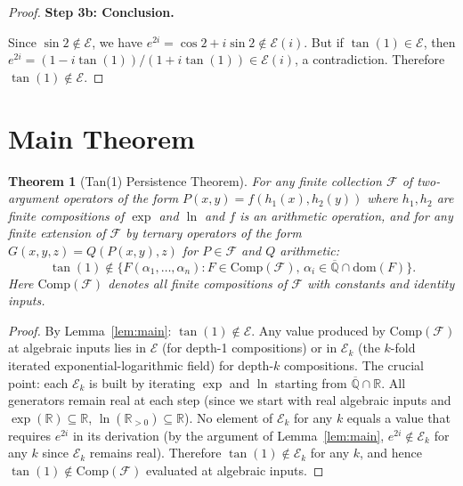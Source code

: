 \documentclass[11pt]{article}
\newtheorem{theorem}{Theorem}
\begin{document}
\begin{proof}
\noindent\textbf{Step 3b: Conclusion.}

Since $\sin 2 \notin \mathcal{E}$, we have $e^{2i} = \cos 2 + i\sin 2 \notin \mathcal{E}(i)$.
But if $\tan(1) \in \mathcal{E}$, then $e^{2i} = (1-i\tan(1))/(1+i\tan(1)) \in \mathcal{E}(i)$,
a contradiction. Therefore $\tan(1) \notin \mathcal{E}$.
\end{proof}

\section{Main Theorem}
\label{sec:theorem}

\begin{theorem}[Tan(1) Persistence Theorem]
\label{thm:main}
For any finite collection $\mathcal{F}$ of two-argument operators of the form
$P(x,y) = f(h_1(x), h_2(y))$ where $h_1, h_2$ are finite compositions of
$\exp$ and $\ln$ and $f$ is an arithmetic operation, and for any finite
extension of $\mathcal{F}$ by ternary operators of the form
$G(x,y,z) = Q(P(x,y), z)$ for $P \in \mathcal{F}$ and $Q$ arithmetic:
\[
  \tan(1) \notin \{F(\alpha_1,\ldots,\alpha_n) :
    F \in \mathrm{Comp}(\mathcal{F}),\, \alpha_i \in \overline{\mathbb{Q}} \cap \mathrm{dom}(F)\}.
\]
Here $\mathrm{Comp}(\mathcal{F})$ denotes all finite compositions of $\mathcal{F}$
with constants and identity inputs.
\end{theorem}

\begin{proof}
By Lemma~\ref{lem:main}: $\tan(1) \notin \mathcal{E}$.
Any value produced by $\mathrm{Comp}(\mathcal{F})$ at algebraic inputs lies in
$\mathcal{E}$ (for depth-1 compositions) or in $\mathcal{E}_k$ (the $k$-fold
iterated exponential-logarithmic field) for depth-$k$ compositions.
The crucial point: each $\mathcal{E}_k$ is built by iterating $\exp$ and $\ln$
starting from $\overline{\mathbb{Q}} \cap \mathbb{R}$. All generators remain real at each step
(since we start with real algebraic inputs and $\exp(\mathbb{R}) \subseteq \mathbb{R}$,
$\ln(\mathbb{R}_{>0}) \subseteq \mathbb{R}$). No element of $\mathcal{E}_k$ for any $k$
equals a value that requires $e^{2i}$ in its derivation (by the argument of Lemma~\ref{lem:main},
$e^{2i} \notin \mathcal{E}_k$ for any $k$ since $\mathcal{E}_k$ remains real).
Therefore $\tan(1) \notin \mathcal{E}_k$ for any $k$, and hence
$\tan(1) \notin \mathrm{Comp}(\mathcal{F})$ evaluated at algebraic inputs.
\end{proof}
\end{document}
